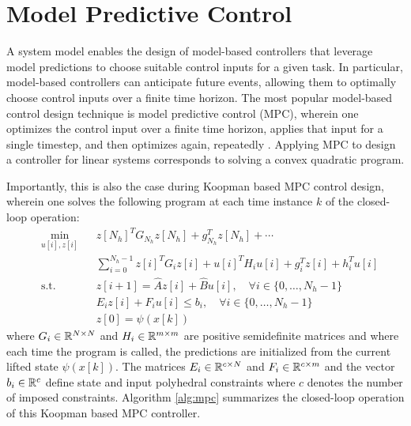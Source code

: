\section{Model Predictive Control}
\label{sec:mpc}

A system model enables the design of model-based controllers that leverage model predictions to choose suitable control inputs for a given task.
In particular, model-based controllers can anticipate future events, allowing them to optimally choose control inputs over a finite time horizon.
The most popular model-based control design technique is model predictive control (MPC), wherein one optimizes the control input over a finite time horizon, applies that input for a single timestep, and then optimizes again, repeatedly \cite{rawlings2009model}.
Applying MPC to design a controller for linear systems corresponds to solving a convex quadratic program. 


Importantly, this is also the case during Koopman based MPC control design, wherein one solves the following program at each time instance $k$ of the closed-loop operation:
\begin{equation}
\begin{aligned}
& \underset{u[i] , z[i]}{\text{min}}
& & z[N_h]^{T} G_{N_h} z[N_h] + g_{N_h}^T z[N_h] + \cdots \\
&&& \sum_{i=0}^{N_h - 1} z[i]^T G_i z[i] + u[i]^T H_i u[i] + g_i^T z[i] + h_i^T u[i]\\
& \text{s.t.}
& & z[i+1] = \hat{A} z[i] + \hat{B} u[i] , \quad \forall i \in \{ 0 , \ldots , N_h - 1 \} \\
&&& E_i z[i] + F_i u[i] \leq b_i , \quad \forall i \in \{ 0 , \ldots , N_h - 1\} \\
&&& z[0] = \psi (x[k])
\end{aligned} \label{eq:mpc}
\end{equation}
where $G_i \in \mathbb{R}^{N \times N}$ and $H_i \in \mathbb{R}^{m \times m}$ are positive semidefinite matrices and where each time the program is called, the predictions are initialized from the current lifted state $\psi (x[k])$.
The matrices $E_i \in \mathbb{R}^{c \times N}$ and $F_i \in \mathbb{R}^{c \times m}$ and the vector $b_i \in \mathbb{R}^{c}$ define state and input polyhedral constraints where $c$ denotes the number of imposed constraints.
Algorithm \ref{alg:mpc} summarizes the closed-loop operation of this Koopman based MPC controller.

